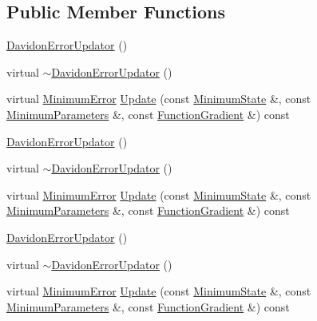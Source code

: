 \subsection*{Public Member Functions}
\begin{DoxyCompactItemize}
\item 
\mbox{\hyperlink{classROOT_1_1Minuit2_1_1DavidonErrorUpdator_ad65143bed469946d2bfb1025755275ee}{Davidon\+Error\+Updator}} ()
\item 
virtual \mbox{\hyperlink{classROOT_1_1Minuit2_1_1DavidonErrorUpdator_a3308df97623b7a93a33d1146e8182fc5}{$\sim$\+Davidon\+Error\+Updator}} ()
\item 
virtual \mbox{\hyperlink{classROOT_1_1Minuit2_1_1MinimumError}{Minimum\+Error}} \mbox{\hyperlink{classROOT_1_1Minuit2_1_1DavidonErrorUpdator_afad671aa523cbd9f17af376c51c3ce97}{Update}} (const \mbox{\hyperlink{classROOT_1_1Minuit2_1_1MinimumState}{Minimum\+State}} \&, const \mbox{\hyperlink{classROOT_1_1Minuit2_1_1MinimumParameters}{Minimum\+Parameters}} \&, const \mbox{\hyperlink{classROOT_1_1Minuit2_1_1FunctionGradient}{Function\+Gradient}} \&) const
\item 
\mbox{\hyperlink{classROOT_1_1Minuit2_1_1DavidonErrorUpdator_ad65143bed469946d2bfb1025755275ee}{Davidon\+Error\+Updator}} ()
\item 
virtual \mbox{\hyperlink{classROOT_1_1Minuit2_1_1DavidonErrorUpdator_a3308df97623b7a93a33d1146e8182fc5}{$\sim$\+Davidon\+Error\+Updator}} ()
\item 
virtual \mbox{\hyperlink{classROOT_1_1Minuit2_1_1MinimumError}{Minimum\+Error}} \mbox{\hyperlink{classROOT_1_1Minuit2_1_1DavidonErrorUpdator_aae088602f78dc3bee91f7ce2534311e9}{Update}} (const \mbox{\hyperlink{classROOT_1_1Minuit2_1_1MinimumState}{Minimum\+State}} \&, const \mbox{\hyperlink{classROOT_1_1Minuit2_1_1MinimumParameters}{Minimum\+Parameters}} \&, const \mbox{\hyperlink{classROOT_1_1Minuit2_1_1FunctionGradient}{Function\+Gradient}} \&) const
\item 
\mbox{\hyperlink{classROOT_1_1Minuit2_1_1DavidonErrorUpdator_ad65143bed469946d2bfb1025755275ee}{Davidon\+Error\+Updator}} ()
\item 
virtual \mbox{\hyperlink{classROOT_1_1Minuit2_1_1DavidonErrorUpdator_a3308df97623b7a93a33d1146e8182fc5}{$\sim$\+Davidon\+Error\+Updator}} ()
\item 
virtual \mbox{\hyperlink{classROOT_1_1Minuit2_1_1MinimumError}{Minimum\+Error}} \mbox{\hyperlink{classROOT_1_1Minuit2_1_1DavidonErrorUpdator_aae088602f78dc3bee91f7ce2534311e9}{Update}} (const \mbox{\hyperlink{classROOT_1_1Minuit2_1_1MinimumState}{Minimum\+State}} \&, const \mbox{\hyperlink{classROOT_1_1Minuit2_1_1MinimumParameters}{Minimum\+Parameters}} \&, const \mbox{\hyperlink{classROOT_1_1Minuit2_1_1FunctionGradient}{Function\+Gradient}} \&) const
\end{DoxyCompactItemize}


